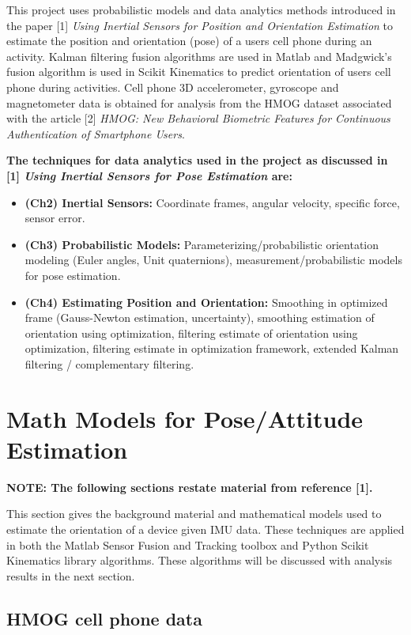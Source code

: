 \documentclass{article}
\begin{document}
This project uses probabilistic models and data analytics methods
introduced in the paper [1] \textit{Using Inertial Sensors for Position
and Orientation Estimation} to estimate the position and orientation
(pose) of a users cell phone during an activity. Kalman filtering fusion algorithms
are used in Matlab and Madgwick's fusion algorithm is used in Scikit Kinematics to predict orientation
of users cell phone during activities.
Cell phone 3D accelerometer, gyroscope and magnetometer data is obtained for
analysis from the HMOG dataset associated with the article [2]
\textit{HMOG: New Behavioral Biometric Features for Continuous
Authentication of Smartphone Users}.

\textbf{The techniques for data analytics used in the project as discussed
in [1] \textit{Using Inertial Sensors for Pose Estimation} are:}

\begin{itemize}
  \item \textbf{(Ch2) Inertial Sensors:} Coordinate frames, angular
    velocity, specific force, sensor error.
  \item \textbf{(Ch3) Probabilistic Models:} Parameterizing/probabilistic
    orientation modeling (Euler angles, Unit quaternions),
    measurement/probabilistic models for pose estimation.
  \item \textbf{(Ch4) Estimating Position and Orientation:} Smoothing
    in optimized frame (Gauss-Newton estimation, uncertainty),
    smoothing estimation of orientation using optimization, filtering
    estimate of orientation using optimization, filtering estimate in
    optimization framework, extended Kalman filtering / complementary
    filtering.
\end{itemize}

\section{Math Models for Pose/Attitude Estimation}

\textbf{NOTE: The following sections restate material from reference [1].}

This section gives the background material and mathematical models used to estimate the orientation of
a device given IMU data. These techniques are applied in both the Matlab Sensor Fusion and Tracking toolbox and
Python Scikit Kinematics library algorithms. These algorithms will be discussed with analysis results in the next
section.

\subsection{HMOG cell phone data}
\end{document}
